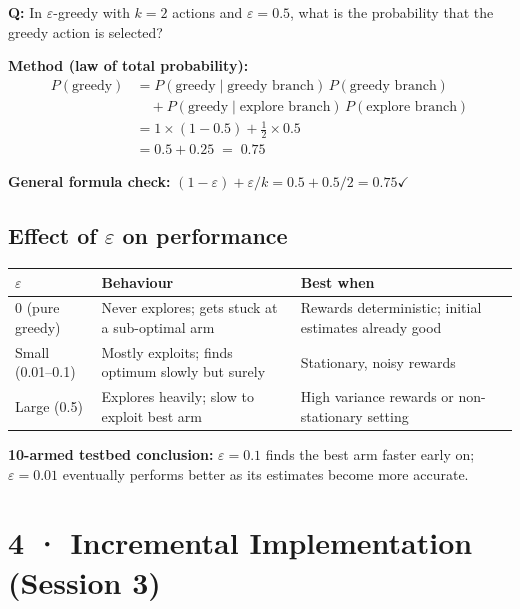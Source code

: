 \documentclass[11pt,a4paper]{article}
\begin{document}
\begin{tcolorbox}[exam={Worked Example 1 — from slides (must know)}]
\textbf{Q:} In $\varepsilon$-greedy with $k = 2$ actions and $\varepsilon = 0.5$,
what is the probability that the greedy action is selected?

\medskip
\textbf{Method (law of total probability):}
\begin{align*}
  P(\text{greedy}) &= P(\text{greedy} \mid \text{greedy branch})\,P(\text{greedy branch})\\
                   &\quad + P(\text{greedy} \mid \text{explore branch})\,P(\text{explore branch})\\
                   &= 1 \times (1 - 0.5) + \tfrac{1}{2} \times 0.5\\
                   &= 0.5 + 0.25 \;=\; \mathbf{0.75}
\end{align*}

\textbf{General formula check:} $(1 - \varepsilon) + \varepsilon/k = 0.5 + 0.5/2 = 0.75\checkmark$
\end{tcolorbox}

\subsection*{Effect of $\varepsilon$ on performance}
\begin{center}
\begin{tabular}{p{2.8cm}p{5.5cm}p{5.5cm}}
\toprule
$\varepsilon$ & Behaviour & Best when \\
\midrule
$0$ (pure greedy) & Never explores; gets stuck at a sub-optimal arm & Rewards deterministic; initial estimates already good \\
Small (0.01--0.1) & Mostly exploits; finds optimum slowly but surely & Stationary, noisy rewards \\
Large (0.5) & Explores heavily; slow to exploit best arm & High variance rewards or non-stationary setting \\
\bottomrule
\end{tabular}
\end{center}

\textbf{10-armed testbed conclusion:} $\varepsilon = 0.1$ finds the best arm faster early on;
$\varepsilon = 0.01$ eventually performs better as its estimates become more accurate.

\section*{4 · Incremental Implementation (Session 3)}
\end{document}

